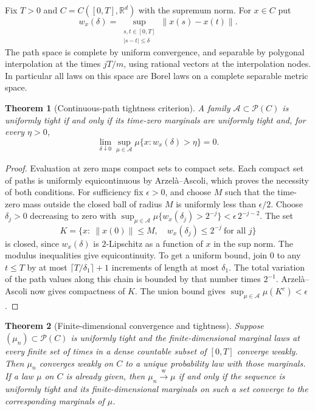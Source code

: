 \documentclass[11pt,oneside,openany]{book}
\newcommand{\R}{\mathbb{R}}
\newcommand{\weakto}{\xrightarrow{\mathrm{w}}}
\theoremstyle{plain}
\newtheorem{theorem}{Theorem}[chapter]
\theoremstyle{definition}
\theoremstyle{remark}
\begin{document}
Fix \(T>0\) and \(C=C([0,T],\R^d)\) with the supremum norm.
For \(x\in C\) put
\[
 w_x(\delta)=\sup_{\substack{s,t\in[0,T]\\|s-t|\leq\delta}}
                      \lVert x(s)-x(t)\rVert .
\]
The path space is complete by uniform convergence, and separable
by polygonal interpolation at the times \(jT/m\), using rational
vectors at the interpolation nodes. In particular all laws on
this space are Borel laws on a complete separable metric space.

\pagebreak[3]
\begin{theorem}[Continuous-path tightness criterion]
\label{thm:p06-path-tightness}
A family \(\mathcal A\subset\mathcal P(C)\) is uniformly tight
if and only if its time-zero marginals are uniformly tight
and, for every \(\eta>0\),
\[
 \lim_{\delta\downarrow0}\sup_{\mu\in\mathcal A}
                  \mu\{x:w_x(\delta)>\eta\}=0.
\]
\end{theorem}

\begin{proof}
Evaluation at zero maps compact sets to compact sets.
Each compact set of paths is uniformly equicontinuous by
Arzel\`a--Ascoli, which proves the necessity of both conditions.
For sufficiency fix \(\epsilon>0\), and choose \(M\) such that
the time-zero mass outside the closed ball of radius \(M\)
is uniformly less than \(\epsilon/2\).
Choose \(\delta_j>0\) decreasing to zero with
\(\sup_{\mu\in\mathcal A}\mu\{w_x(\delta_j)>2^{-j}\}
 <\epsilon\,2^{-j-2}\). The set
\[
 K=\{x:\ \lVert x(0)\rVert\leq M,\quad
               w_x(\delta_j)\leq2^{-j}\ \text{for all }j\}
\]
is closed, since \(w_x(\delta)\) is \(2\)-Lipschitz as a
function of \(x\) in the sup norm. The modulus inequalities
give equicontinuity. To get a uniform bound, join \(0\) to any
\(t\leq T\) by at most \(\lceil T/\delta_1\rceil+1\)
increments of length at most \(\delta_1\). The total variation
of the path values along this chain is bounded by that number
times \(2^{-1}\). Arzel\`a--Ascoli now gives compactness of \(K\).
The union bound gives \(\sup_{\mu\in\mathcal A}\mu(K^c)<\epsilon\).
\end{proof}

\begin{theorem}[Finite-dimensional convergence and tightness]
\label{thm:p06-path-weak}
Suppose \((\mu_n)\subset\mathcal P(C)\) is uniformly tight
and the finite-dimensional marginal laws at every finite
set of times in a dense countable subset of \([0,T]\)
converge weakly. Then \(\mu_n\) converges weakly on \(C\) to
a unique probability law with those marginals.
If a law \(\mu\) on \(C\) is already given, then
\(\mu_n\weakto\mu\) if and only if the sequence is
uniformly tight and its finite-dimensional marginals on
such a set converge to the corresponding marginals of \(\mu\).
\end{theorem}
\end{document}
